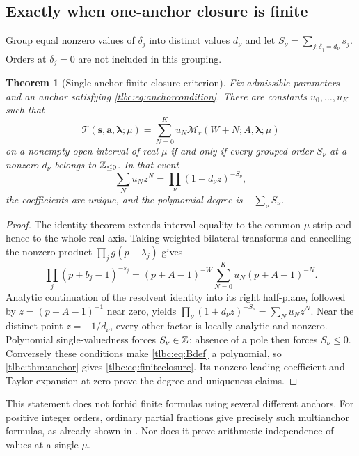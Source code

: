 \documentclass[11pt,letterpaper]{article}
\numberwithin{equation}{section}
\newtheorem{theorem}{Theorem}[section]
\theoremstyle{definition}\newtheorem{definition}[theorem]{Definition}
\theoremstyle{remark}\newtheorem{remark}[theorem]{Remark}
\newcommand{\M}{\mathcal M}\newcommand{\T}{\mathcal T}\newcommand{\K}{\mathcal K}
\newcommand{\bs}{\boldsymbol s}\newcommand{\ba}{\boldsymbol a}\newcommand{\bl}{\boldsymbol\lambda}
\begin{document}
\subsection{Exactly when one-anchor closure is finite}
Group equal nonzero values of $\delta_j$ into distinct values $d_\nu$ and let
$S_\nu=\sum_{j:\delta_j=d_\nu}s_j$. Orders at $\delta_j=0$ are not included in this grouping.

\begin{theorem}[Single-anchor finite-closure criterion]\label{tlbc:thm:finite}
Fix admissible parameters and an anchor satisfying \eqref{tlbc:eq:anchorcondition}. There are constants $u_0,\ldots,u_K$ such that
\begin{equation}\label{tlbc:eq:finiteclosure}
 \T(\bs,\ba,\bl;\mu)
 =\sum_{N=0}^K u_N\M_r(W+N;A,\bl;\mu)
\end{equation}
on a nonempty open interval of real $\mu$ if and only if every grouped order $S_\nu$ at a nonzero $d_\nu$ belongs to $\mathbb Z_{\le0}$. In that event
\begin{equation}\label{tlbc:eq:closurepoly}
 \sum_Nu_Nz^N=\prod_\nu(1+d_\nu z)^{-S_\nu},
\end{equation}
the coefficients are unique, and the polynomial degree is $-\sum_\nu S_\nu$.
\end{theorem}
\begin{proof}
The identity theorem extends interval equality to the common $\mu$ strip and hence to the whole real axis. Taking weighted bilateral transforms and cancelling the nonzero product $\prod_jg(p-\lambda_j)$ gives
\[
 \prod_j(p+b_j-1)^{-s_j}
 =(p+A-1)^{-W}\sum_{N=0}^K u_N(p+A-1)^{-N}.
\]
Analytic continuation of the resolvent identity into its right half-plane, followed by $z=(p+A-1)^{-1}$ near zero, yields
$\prod_\nu(1+d_\nu z)^{-S_\nu}=\sum_Nu_Nz^N$.
Near the distinct point $z=-1/d_\nu$, every other factor is locally analytic and nonzero. Polynomial single-valuedness forces $S_\nu\in\mathbb Z$; absence of a pole then forces $S_\nu\le0$. Conversely these conditions make \eqref{tlbc:eq:Bdef} a polynomial, so \cref{tlbc:thm:anchor} gives \eqref{tlbc:eq:finiteclosure}. Its nonzero leading coefficient and Taylor expansion at zero prove the degree and uniqueness claims.
\end{proof}

This statement does not forbid finite formulas using several different anchors. For positive integer orders, ordinary partial fractions give precisely such multianchor formulas, as already shown in \cite{RLC}. Nor does it prove arithmetic independence of values at a single $\mu$.
\end{document}
